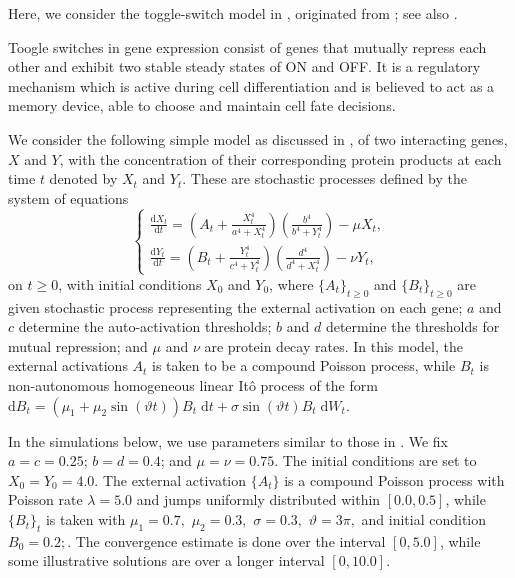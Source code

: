 \documentclass[reqno,12pt]{amsart}
\theoremstyle{plain} %
\theoremstyle{definition} %
\begin{document}
Here, we consider the toggle-switch model in \cite[Section 7.8]{Asai2016}, originated from \cite{VerdCrombachJaeger2014}; see also \cite{StrasserTheisMarr2012}.

Toogle switches in gene expression consist of genes that mutually repress each other and exhibit two stable steady states of ON and OFF. It is a regulatory mechanism which is active during cell differentiation and is believed to act as a memory device, able to choose and maintain cell fate decisions.

We consider the following simple model as discussed in \cite[Section 7.8]{Asai2016}, of two interacting genes, $X$ and $Y$, with the concentration of their corresponding protein products at each time $t$ denoted by $X_t$ and $Y_t$. These are stochastic processes defined by the system of equations
\begin{equation}
    \label{toggleswitchsystem}
   \begin{cases}
   \frac{\displaystyle \mathrm{d}X_t}{\displaystyle \mathrm{d} t} = \left( A_t + \frac{\displaystyle X_t^4}{\displaystyle a^4 + X_t^4}\right)\left(\frac{\displaystyle b^4}{\displaystyle b^4 + Y_t^4}\right) - \mu X_t, \\
   \frac{\displaystyle \mathrm{d}Y_t}{\displaystyle \mathrm{d} t} = \left( B_t + \frac{\displaystyle Y_t^4}{\displaystyle c^4 + Y_t^4}\right)\left(\frac{\displaystyle d^4}{\displaystyle d^4 + X_t^4}\right) - \nu Y_t,
   \end{cases}
\end{equation}
on $t \geq 0$, with initial conditions $X_0$ and $Y_0$, where $\{A_t\}_{t\geq 0}$ and $\{B_t\}_{t\geq 0}$ are given stochastic process representing the external activation on each gene; $a$ and $c$ determine the auto-activation thresholds; $b$ and $d$ determine the thresholds for mutual repression; and $\mu$ and $\nu$ are protein decay rates. In this model, the external activations $A_t$ is taken to be a compound Poisson process, while $B_t$ is non-autonomous homogeneous linear It\^o process of the form $\mathrm{d}B_t = (\mu_1 + \mu_2\sin(\vartheta t))B_t\;\mathrm{d}t + \sigma\sin(\vartheta t)B_t\;\mathrm{d}W_t$.

In the simulations below, we use parameters similar to those in \cite[Section 7.8]{Asai2016}. We fix $a = c = 0.25$; $b = d = 0.4$; and $\mu = \nu = 0.75$. The initial conditions are set to $X_0 = Y_0 = 4.0$. The external activation $\{A_t\}$ is a compound Poisson process with Poisson rate $\lambda = 5.0$ and jumps uniformly distributed within $[0.0, 0.5]$, while $\{B_t\}_t$ is taken with $\mu_1 = 0.7,$ $\mu_2 = 0.3,$ $\sigma = 0.3,$ $\vartheta=3\pi,$ and initial condition $B_0 = 0.2;$. The convergence estimate is done over the interval $[0, 5.0]$, while some illustrative solutions are over a longer interval $[0, 10.0]$.
\end{document}
